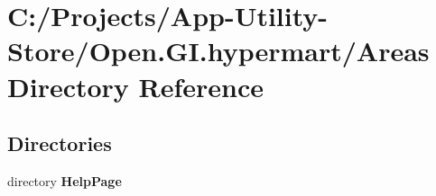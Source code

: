 \section{C\+:/\+Projects/\+App-\/\+Utility-\/\+Store/\+Open.G\+I.\+hypermart/\+Areas Directory Reference}
\label{dir_38f56e502c6cf86f302d6f6e10c7cb39}
\subsection*{Directories}
\begin{DoxyCompactItemize}
\item 
directory \textbf{ Help\+Page}
\end{DoxyCompactItemize}
